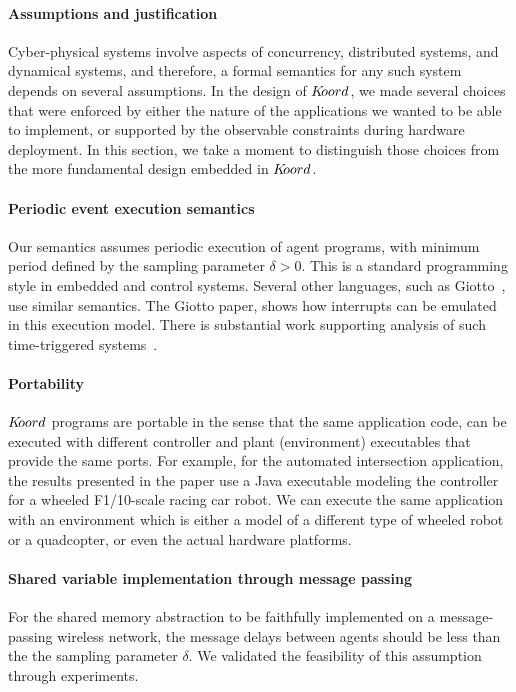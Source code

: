 \paragraph{Assumptions and justification}
Cyber-physical systems involve aspects of concurrency, distributed systems, and dynamical systems, and therefore, a formal semantics for any such system depends on several assumptions. In the design of $K\kern-2pt oord$, we made several choices that were enforced by either the nature of the applications we wanted to be able to implement, or supported by the observable constraints during hardware deployment.  In this section, we take a moment to distinguish those choices from the more fundamental design embedded in $K\kern-2pt oord$.

\paragraph*{Periodic event execution semantics}
Our semantics assumes periodic execution of agent programs, with minimum period defined by the sampling parameter $\delta>0$. This is a standard programming style in embedded and control systems. Several other languages, such as Giotto~\cite{henzinger2003giotto,benveniste2003synchronous}, use  similar semantics. The Giotto paper, shows how  interrupts can be emulated in this execution model. There is substantial work supporting analysis of such time-triggered systems~\cite{WMLM:TECS2010}.

\paragraph*{Portability}
$K\kern-2pt oord$ programs are portable in the sense that the same application code, can be executed with different controller and plant (environment) executables that provide the same ports. For example, for the automated intersection application, the results presented in the paper use a Java executable modeling the controller for a wheeled F1/10-scale racing car robot. We can execute the same application with an environment which is either a model of a different type of wheeled robot or a quadcopter, or even the actual hardware platforms. 

\paragraph*{Shared variable implementation through message passing}
For the shared memory abstraction to be faithfully implemented on a message-passing wireless network, the message delays between agents should be less than the the sampling parameter $\delta$. We validated the feasibility of this assumption through experiments.

